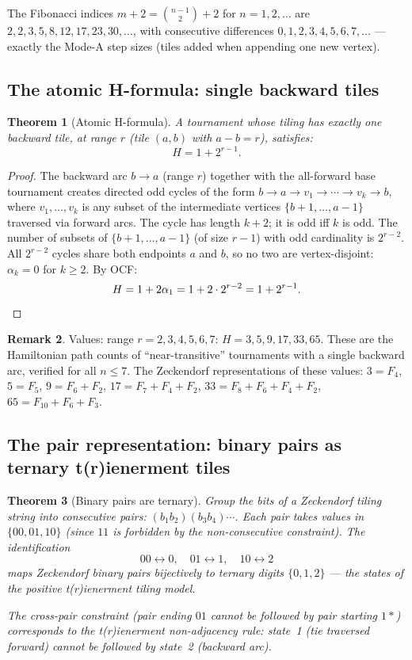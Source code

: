 \documentclass[12pt,reqno]{amsart}
\newtheorem{theorem}{Theorem}[section]
\theoremstyle{definition}
\newtheorem{remark}[theorem]{Remark}
\theoremstyle{plain}
\begin{document}
The Fibonacci indices $m+2=\binom{n-1}{2}+2$ for $n=1,2,\ldots$ are
$2,2,3,5,8,12,17,23,30,\ldots$, with consecutive differences
$0,1,2,3,4,5,6,7,\ldots$ — exactly the Mode-A step sizes (tiles added
when appending one new vertex).

\subsection{The atomic H-formula: single backward tiles}
\label{ssec:single-tile}

\begin{theorem}[Atomic H-formula]\label{thm:atomic-H}
A tournament whose tiling has exactly one backward tile, at range $r$
(tile $(a,b)$ with $a-b=r$), satisfies:
\[
  H=1+2^{r-1}.
\]
\end{theorem}

\begin{proof}
The backward arc $b\to a$ (range $r$) together with the all-forward
base tournament creates directed odd cycles of the form
$b\to a\to v_1\to\cdots\to v_k\to b$, where $v_1,\ldots,v_k$ is any
subset of the intermediate vertices $\{b+1,\ldots,a-1\}$ traversed
via forward arcs.  The cycle has length $k+2$; it is odd iff $k$ is odd.
The number of subsets of $\{b+1,\ldots,a-1\}$ (of size $r-1$) with odd
cardinality is $2^{r-2}$.  All $2^{r-2}$ cycles share both endpoints $a$
and $b$, so no two are vertex-disjoint: $\alpha_k=0$ for $k\ge2$.  By OCF:
\[
  H=1+2\alpha_1=1+2\cdot2^{r-2}=1+2^{r-1}.\qedhere
\]
\end{proof}

\begin{remark}
Values: range $r=2,3,4,5,6,7$: $H=3,5,9,17,33,65$.  These are the
Hamiltonian path counts of ``near-transitive'' tournaments
with a single backward arc, verified for all $n\le7$.
The Zeckendorf representations of these values:
$3=F_4$, $5=F_5$, $9=F_6+F_2$, $17=F_7+F_4+F_2$, $33=F_8+F_6+F_4+F_2$, $65=F_{10}+F_6+F_3$.
\end{remark}

\subsection{The pair representation: binary pairs as ternary t(r)ienerment tiles}
\label{ssec:pairs-ternary}

\begin{theorem}[Binary pairs are ternary]\label{thm:pairs-ternary}
Group the bits of a Zeckendorf tiling string into consecutive pairs:
$(b_1b_2)(b_3b_4)\cdots$.  Each pair takes values in
$\{00,01,10\}$ (since $11$ is forbidden by the non-consecutive constraint).
The identification
\[
  00\leftrightarrow0,\quad 01\leftrightarrow1,\quad 10\leftrightarrow2
\]
maps Zeckendorf binary pairs \emph{bijectively} to ternary digits
$\{0,1,2\}$ — the states of the positive t(r)ienerment tiling model.

The \emph{cross-pair constraint} (pair ending $01$ cannot be followed by
pair starting $1\ast$) corresponds to the t(r)ienerment non-adjacency rule:
state~1 (tie traversed forward) cannot be followed by state~2 (backward arc).
\end{theorem}
\end{document}
